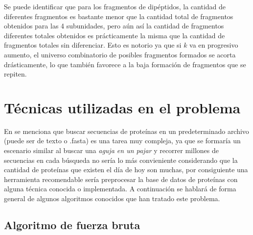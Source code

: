 Se puede identificar que para los fragmentos de dipéptidos, la cantidad de diferentes fragmentos es bastante menor que la cantidad total de fragmentos obtenidos para las 4 subunidades, pero aún así la cantidad de fragmentos diferentes totales obtenidos es prácticamente la misma que la cantidad de fragmentos totales sin diferenciar. Esto es notorio ya que si $k$ va en progresivo aumento, el universo combinatorio de posibles fragmentos formados se acorta drásticamente, lo que también favorece a la baja formación de fragmentos que se repiten.\\


\section{Técnicas utilizadas en el problema}

En \cite{searching} se menciona que buscar secuencias de proteínas en un predeterminado archivo (puede ser de texto o .fasta) es una tarea muy compleja, ya que se formaría un escenario similar al buscar una {\textit{aguja en un pajar}} y recorrer millones de secuencias en cada búsqueda no sería lo más convieniente considerando que la cantidad de proteínas que existen el día de hoy son muchas, por consiguiente una herramienta recomendable sería preprocesar la base de datos de proteínas con alguna técnica conocida o implementada. A continuación se hablará de forma general de algunos algoritmos conocidos que han tratado este problema.

\subsection{Algoritmo de fuerza bruta}

